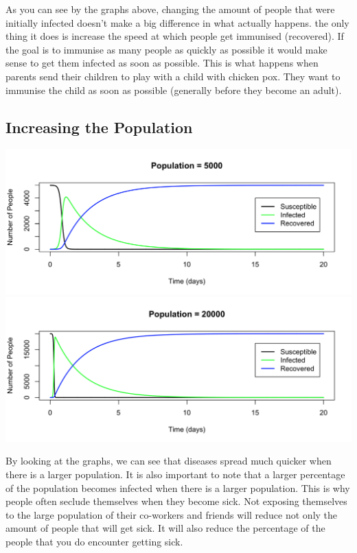 \documentclass{article}
\begin{document}
        As you can see by the graphs above, changing the amount of people that were initially infected doesn't make a big difference in what actually happens. the only thing it does is increase the speed at which people get immunised (recovered). If the goal is to immunise as many people as quickly as possible it would make sense to get them infected as soon as possible. This is what happens when parents send their children to play with a child with chicken pox. They want to immunise the child as soon as possible (generally before they become an adult).
    
    \subsection{Increasing the Population}
        \includegraphics[width=\textwidth,height=\textheight,keepaspectratio]{sir_population_5000.png}
        \includegraphics[width=\textwidth,height=\textheight,keepaspectratio]{sir_population_20000.png}

        By looking at the graphs, we can see that diseases spread much quicker when there is a larger population. It is also important to note that a larger percentage of the population becomes infected when there is a larger population. This is why people often seclude themselves when they become sick. Not exposing themselves to the large population of their co-workers and friends will reduce not only the amount of people that will get sick. It will also reduce the percentage of the people that you do encounter getting sick.
\end{document}

